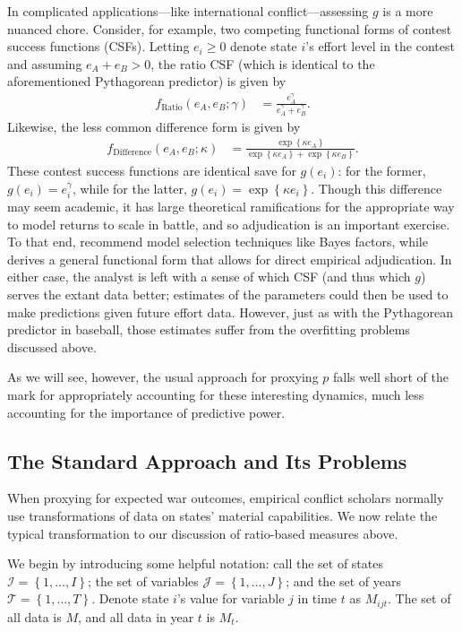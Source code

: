In complicated applications---like international conflict---assessing $g$ is a more nuanced chore. 
Consider, for example, two competing functional forms of contest success functions (CSFs). 
Letting $e_i \geq 0$ denote state $i$'s effort level in the contest and assuming $e_A + e_B > 0$, the ratio CSF (which is identical to the aforementioned Pythagorean predictor) is given by
\begin{align*}
  f_\text{Ratio}(e_A,e_B; \gamma) &= \frac{e_A^\gamma}{e_A^\gamma + e_B^\gamma}.
\end{align*}
Likewise, the less common difference form is given by
\begin{align*}
  f_\text{Difference}(e_A,e_B;\kappa) &= \frac{\exp\left\{\kappa e_A\right\}}{\exp\left\{\kappa e_A\right\} + \exp\left\{\kappa e_B\right\}}.
\end{align*}
These contest success functions are identical save for $g(e_i)$: for the former, $g(e_i) = e_i^\gamma$, while for the latter, $g(e_i) = \exp\left\{\kappa e_i\right\}$. 
Though this difference may seem academic, it has large theoretical ramifications for the appropriate way to model returns to scale in battle, and so adjudication is an important exercise. 
To that end, \citet{jia2013} recommend model selection techniques like Bayes factors, while \citet{hwang2012} derives a general functional form that allows for direct empirical adjudication. 
In either case, the analyst is left with a sense of which CSF (and thus which $g$) serves the extant data better; estimates of the parameters could then be used to make predictions given future effort data. 
However, just as with the Pythagorean predictor in baseball, those estimates suffer from the overfitting problems discussed above.

As we will see, however, the usual approach for proxying $p$ falls well short of the mark for appropriately accounting for these interesting dynamics, much less accounting for the importance of predictive power.

\subsection{The Standard Approach and Its Problems}

When proxying for expected war outcomes, empirical conflict scholars normally use transformations of data on states' material capabilities. 
We now relate the typical transformation to our discussion of ratio-based measures above.

We begin by introducing some helpful notation: call the set of states $\mathcal{I} = \left\{1, \ldots, I\right\}$; the set of variables $\mathcal{J} = \left\{1,\ldots,J\right\}$; and the set of years $\mathcal{T} = \left\{1,\ldots, T\right\}$. 
Denote state $i$'s value for variable $j$ in time $t$ as $M_{ijt}$. 
The set of all data is $M$, and all data in year $t$ is $M_t$.

